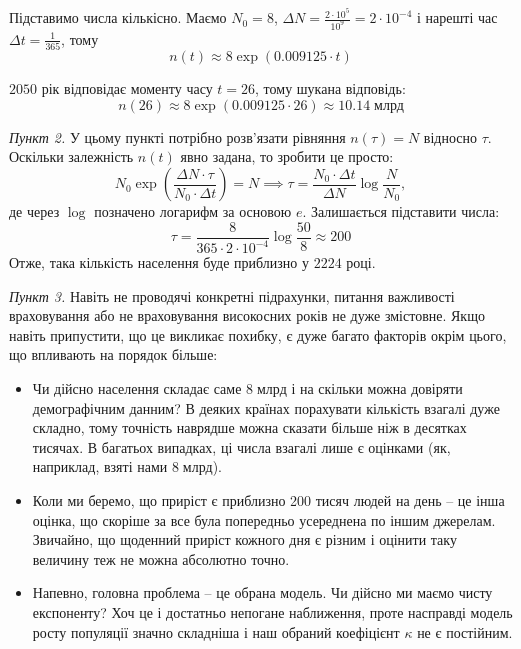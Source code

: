 \documentclass[oneside,solution]{tmpl}
\begin{document}
Підставимо числа кількісно. Маємо $N_0=8$, $\Delta N = \frac{2 \cdot 10^5}{10^9} = 2 \cdot 10^{-4}$ і нарешті час $\Delta t = \frac{1}{365}$, тому
\begin{equation}
    n(t) \approx 8 \exp (0.009125\cdot t)
\end{equation}

$2050$ рік відповідає моменту часу $t=26$, тому шукана відповідь:
\begin{equation}
    n(26) \approx 8 \exp(0.009125 \cdot 26) \approx \boxed{10.14 \; \text{млрд}}
\end{equation}

\textit{Пункт 2.} У цьому пункті потрібно розв'язати рівняння $n(\tau)=N$ відносно $\tau$. Оскільки залежність $n(t)$ явно задана, то зробити це просто:
\begin{equation}
    N_0 \exp \left(\frac{\Delta N \cdot \tau}{N_0 \cdot \Delta t}\right) = N \implies \tau = \frac{N_0 \cdot \Delta t}{\Delta N} \log \frac{N}{N_0},
\end{equation}
де через $\log$ позначено логарифм за основою $e$. Залишається підставити числа:
\begin{equation}
    \tau = \frac{8}{365 \cdot 2 \cdot 10^{-4}}\log \frac{50}{8} \approx 200
\end{equation}
Отже, така кількість населення буде приблизно у $\boxed{2224}$ році.

\textit{Пункт 3.} Навіть не проводячі конкретні підрахунки, питання важливості враховування або не враховування високосних років не дуже змістовне. Якщо навіть припустити, що це викликає похибку, є дуже багато факторів окрім цього, що впливають на порядок більше:
\begin{itemize}
    \item Чи дійсно населення складає саме $8 \; \text{млрд}$ і на скільки можна довіряти демографічним данним? В деяких країнах порахувати кількість взагалі дуже складно, тому точність наврядше можна сказати більше ніж в десятках тисячах. В багатьох випадках, ці числа взагалі лише є оцінками (як, наприклад, взяті нами $8 \; \text{млрд}$).
    \item Коли ми беремо, що приріст є приблизно 200 тисяч людей на день -- це інша оцінка, що скоріше за все була попередньо усереднена по іншим джерелам. Звичайно, що щоденний приріст кожного дня є різним і оцінити таку величину теж не можна абсолютно точно.
    \item Напевно, головна проблема -- це обрана модель. Чи дійсно ми маємо чисту експоненту? Хоч це і достатньо непогане наближення, проте насправді модель росту популяції значно складніша і наш обраний коефіцієнт $\kappa$ не є постійним.
\end{itemize}
\end{document}
